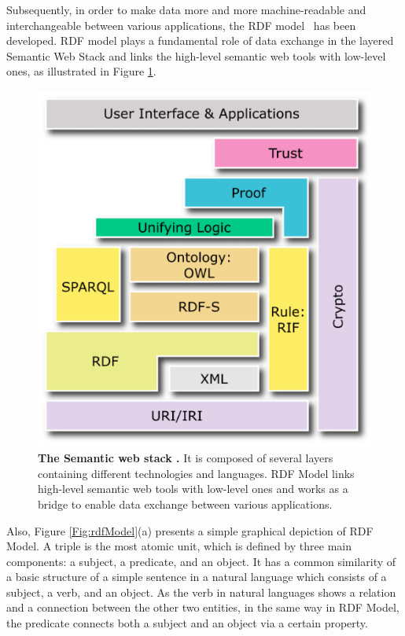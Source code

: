Subsequently, in order to make data more and more machine-readable and interchangeable between various applications, the RDF model~\cite{W3C:RDF-Primer:Online} has been developed.  
RDF model plays a fundamental role of data exchange in the layered Semantic Web Stack and links the high-level semantic web tools with low-level ones, as illustrated in {Figure \ref{Fig:semanticWebStack}}. 
	\begin{figure}[ht]
	\begin{center}
	\setlength\belowcaptionskip{-7mm}
		\includegraphics[scale=0.5,angle=0]{images/semanticWebStack}
		\caption{\textbf{The Semantic web stack \cite{W3C:SemanticStack:Online}.} It is composed of several layers containing different technologies and languages. 
		RDF Model links high-level semantic web tools with low-level ones and works as a bridge to enable data exchange between various applications.}
		\label{Fig:semanticWebStack}
	\end{center}
\end{figure}
\par
Also, {Figure \ref{Fig:rdfModel}}(a) presents a simple graphical depiction of RDF Model. 
A triple is the most atomic unit, which is defined by three main components: a subject, a predicate, and an object. 
It has a common similarity of a basic structure of a simple sentence in a natural language which consists of a subject, a verb, and an object. 
As the verb in natural languages shows a relation and a connection between the other two entities, in the same way in RDF Model, the predicate connects both a subject and an object via a certain property. 

